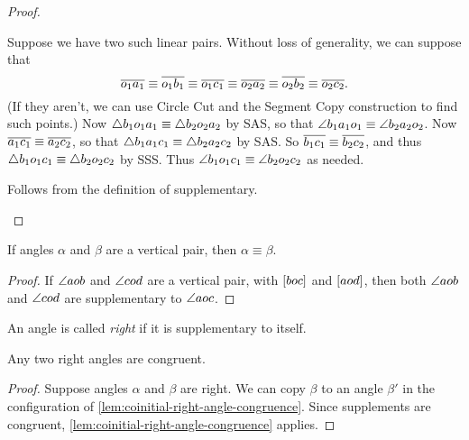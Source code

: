 \begin{proof}\mbox{}
\begin{proplist}
\item Suppose we have two such linear pairs.
Without loss of generality, we can suppose that \[ \overline{o_1a_1} \equiv \overline{o_1b_1} \equiv \overline{o_1c_1} \equiv \overline{o_2a_2} \equiv \overline{o_2b_2} \equiv \overline{o_2c_2}. \] (If they aren't, we can use Circle Cut and the Segment Copy construction to find such points.) Now \(\bigtriangleup{b_1o_1a_1} \equiv \bigtriangleup{b_2o_2a_2}\) by SAS, so that \(\angle{b_1a_1o_1} \equiv \angle{b_2a_2o_2}\).
Now \(\overline{a_1c_1} \equiv \overline{a_2c_2}\), so that \(\bigtriangleup{b_1a_1c_1} \equiv \bigtriangleup{b_2a_2c_2}\) by SAS.
So \(\overline{b_1c_1} \equiv \overline{b_2c_2}\), and thus \(\bigtriangleup{b_1o_1c_1} \equiv \bigtriangleup{b_2o_2c_2}\) by SSS.
Thus \(\angle{b_1o_1c_1} \equiv \angle{b_2o_2c_2}\) as needed.

\item Follows from the definition of supplementary.
\qedhere
\end{proplist}
\end{proof}

\begin{cor}
If angles \(\alpha\) and \(\beta\) are a vertical pair, then \(\alpha \equiv \beta\).
\end{cor}

\begin{proof}
If \(\angle{aob}\) and \(\angle{cod}\) are a vertical pair, with \([ b o c ]\) and \([ a o d ]\), then both \(\angle{aob}\) and \(\angle{cod}\) are supplementary to \(\angle{aoc}\).
\end{proof}

\begin{dfn}
An angle is called \emph{right} if it is supplementary to itself.
\end{dfn}

\begin{cor}
Any two right angles are congruent.
\end{cor}

\begin{proof}
Suppose angles \(\alpha\) and \(\beta\) are right.
We can copy \(\beta\) to an angle \(\beta'\) in the configuration of \ref{lem:coinitial-right-angle-congruence}.
Since supplements are congruent, \ref{lem:coinitial-right-angle-congruence} applies.
\end{proof}


